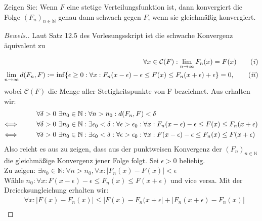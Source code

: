 \begin{lemma}
    Zeigen Sie: Wenn $F$ eine stetige Verteilungsfunktion ist, dann konvergiert die Folge $(F_n)_{n \in \mathbb{N}}$ genau dann
    schwach gegen $F$, wenn sie gleichmäßig konvergiert.
\end{lemma}
\begin{proof}[Beweis.]
    Laut Satz 12.5 des Vorlesungsskript ist die schwache Konvergenz äquivalent zu

    \begin{align*}
    \forall x \in \mathcal{C}(F): \lim_{n \rightarrow \infty} F_n(x) = F(x) \tag{\textit{i}} \label{eq:first} \\
    \lim_{n \rightarrow \infty} d(F_n,F) := \inf \{\epsilon \geq 0: \forall x: F_n(x - \epsilon) - \epsilon \leq F(x) \leq F_n(x + \epsilon) + \epsilon\} = 0, \tag{\textit{ii}} \label{eq:second} \\
\end{align*}
    wobei $\mathcal{C}(F)$ die Menge aller Stetigkeitspunkte von F bezeichnet.
    Aus \label{eq:second} erhalten wir:
\begin{align*}
    &\forall \delta > 0~ \exists n_0 \in \mathbb{N}: \forall n > n_0: d(F_n,F) < \delta\\
    \Longleftrightarrow \hspace{10mm} &\forall \delta > 0~ \exists n_0 \in \mathbb{N}: \exists \epsilon_0 < \delta: \forall \epsilon > \epsilon_0: \forall x: F_n(x - \epsilon) - \epsilon \leq F(x) \leq F_n(x + \epsilon) \\
    \Longleftrightarrow \hspace{10mm} &\forall \delta > 0~ \exists n_0 \in \mathbb{N}: \exists \epsilon_0 < \delta: \forall \epsilon > \epsilon_0: \forall x: F(x - \epsilon) - \epsilon \leq F_n(x) \leq F(x + \epsilon) \\
\end{align*}
Also reicht es aus zu zeigen, dass aus der punktweisen Konvergenz der $(F_n)_{n \in \mathbb{N}}$ die gleichmäßige Konvergenz jener Folge folgt.
Sei $\epsilon > 0$ beliebig. \\
Zu zeigen: $\exists n_0 \in \mathbb{N}: \forall n > n_0, \forall x: | F_n(x) - F(x) | < \epsilon $\\
Wähle $n_0: \forall x: F(x - \epsilon) - \epsilon \leq F_n(x) \leq F(x + \epsilon) $ und vice versa.
Mit der Dreiecksungleichung erhalten wir:
\begin{align*}
  &\forall x: | F(x) - F_n(x)| \leq | F(x) - F_n(x + \epsilon | + | F_n(x + \epsilon) - F_n(x) | \\

\end{align*}
\end{proof}
